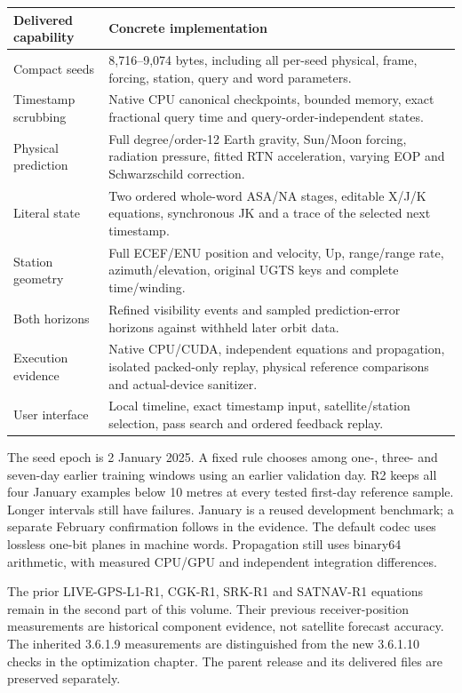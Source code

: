 \documentclass[11pt,a4paper]{article}
\begin{document}
\begin{tabularx}{\textwidth}{@{}P{.28\textwidth}Y@{}}\toprule
\textbf{Delivered capability} & \textbf{Concrete implementation}\\\midrule
Compact seeds & 8,716--9,074 bytes, including all per-seed physical, frame, forcing, station, query and word parameters.\\
Timestamp scrubbing & Native CPU canonical checkpoints, bounded memory, exact fractional query time and query-order-independent states.\\
Physical prediction & Full degree/order-12 Earth gravity, Sun/Moon forcing, radiation pressure, fitted RTN acceleration, varying EOP and Schwarzschild correction.\\
Literal state & Two ordered whole-word ASA/NA stages, editable X/J/K equations, synchronous JK and a trace of the selected next timestamp.\\
Station geometry & Full ECEF/ENU position and velocity, Up, range/range rate, azimuth/elevation, original UGTS keys and complete time/winding.\\
Both horizons & Refined visibility events and sampled prediction-error horizons against withheld later orbit data.\\
Execution evidence & Native CPU/CUDA, independent equations and propagation, isolated packed-only replay, physical reference comparisons and actual-device sanitizer.\\
User interface & Local timeline, exact timestamp input, satellite/station selection, pass search and ordered feedback replay.\\\bottomrule
\end{tabularx}

The seed epoch is 2 January 2025. A fixed rule chooses among one-, three- and
seven-day earlier training windows using an earlier validation day. R2 keeps all
four January examples below 10 metres at every tested first-day reference sample.
Longer intervals still have failures. January is a reused development benchmark;
a separate February confirmation follows in the evidence. The default codec
uses lossless one-bit planes in machine words. Propagation still uses binary64
arithmetic, with measured CPU/GPU and independent integration differences.

The prior LIVE-GPS-L1-R1, CGK-R1, SRK-R1 and SATNAV-R1 equations remain in the
second part of this volume. Their previous receiver-position measurements are
historical component evidence, not satellite forecast accuracy. The inherited 3.6.1.9 measurements are distinguished from the new
3.6.1.10 checks in the optimization chapter. The parent release and
its delivered files are preserved separately.
\clearpage
\tableofcontents\clearpage




\end{document}
